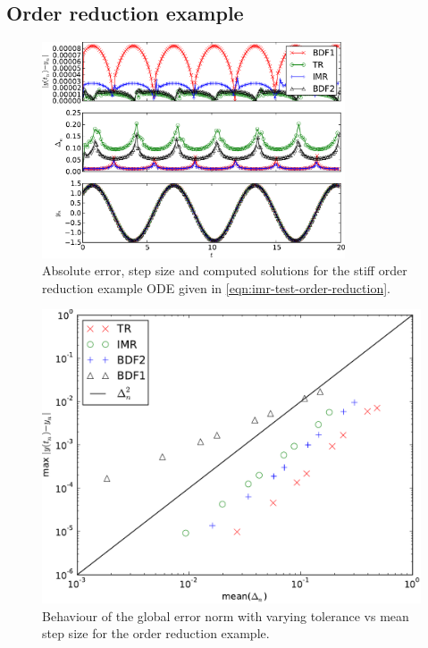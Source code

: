 \subsection{Order reduction example}
\label{sec:order-reduct-example}

\begin{figure}
  \centering  \includegraphics[width=0.8\textwidth]{plots/aimr_odes_traces/strong_order_reduction-errornormsvs-dtsvs-tracevaluesvstimes}
  \caption{Absolute error, step size and computed solutions for the stiff order reduction example ODE given in \cref{eqn:imr-test-order-reduction}.}
  \label{fig:imr-order-reduction-example}
\end{figure}

\begin{figure}
  \centering  \includegraphics[width=1\textwidth]{plots/aimr_odes/order_reduction-maxoferrornormsvsmeanofdts.pdf}
  \caption{Behaviour of the global error norm with varying tolerance vs mean step size for the order reduction example.}
  \label{fig:imr-order-reduction-convergence}
\end{figure}

